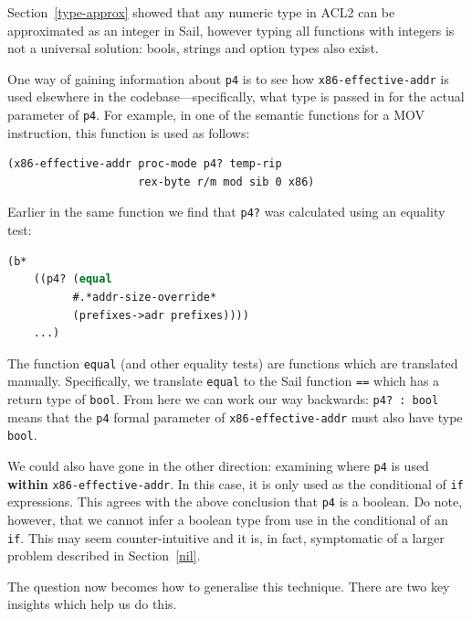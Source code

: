 \documentclass[a4paper,12pt,twoside,openright]{report}
\begin{document}
Section~\ref{type-approx} showed that any numeric type in ACL2 can be approximated as an integer in Sail, however typing all functions with integers is not a universal solution: bools, strings and option types also exist.

One way of gaining information about \texttt{p4} is to see how \texttt{x86-effective-addr} is used elsewhere in the codebase---specifically, what type is passed in for the actual parameter of \texttt{p4}.  For example, in one of the semantic functions for a MOV instruction, this function is used as follows:

\begin{minipage}{\linewidth}
\begin{lstlisting}
(x86-effective-addr proc-mode p4? temp-rip
                    rex-byte r/m mod sib 0 x86)
\end{lstlisting}
\end{minipage}

Earlier in the same function we find that \texttt{p4?} was calculated using an equality test:

\begin{minipage}{\linewidth}
\begin{lstlisting}[language=lisp]
(b*
	((p4? (equal
          #.*addr-size-override*
          (prefixes->adr prefixes))))
	...)
\end{lstlisting}
\end{minipage}

The function \texttt{equal} (and other equality tests) are functions which are translated manually.  Specifically, we translate \texttt{equal} to the Sail function \texttt{==} which has a return type of \texttt{bool}.  From here we can work our way backwards: \texttt{p4? : bool} means that the \texttt{p4} formal parameter of \texttt{x86-effective-addr} must also have type \texttt{bool}.

We could also have gone in the other direction: examining where \texttt{p4} is used \textbf{within} \texttt{x86-effective-addr}.  In this case, it is only used as the conditional of \texttt{if} expressions.  This agrees with the above conclusion that \texttt{p4} is a boolean.  Do note, however, that we cannot infer a boolean type from use in the conditional of an \texttt{if}.  This may seem counter-intuitive and it is, in fact, symptomatic of a larger problem described in Section~\ref{nil}.

The question now becomes how to generalise this technique.  There are two key insights which help us do this.
\end{document}
